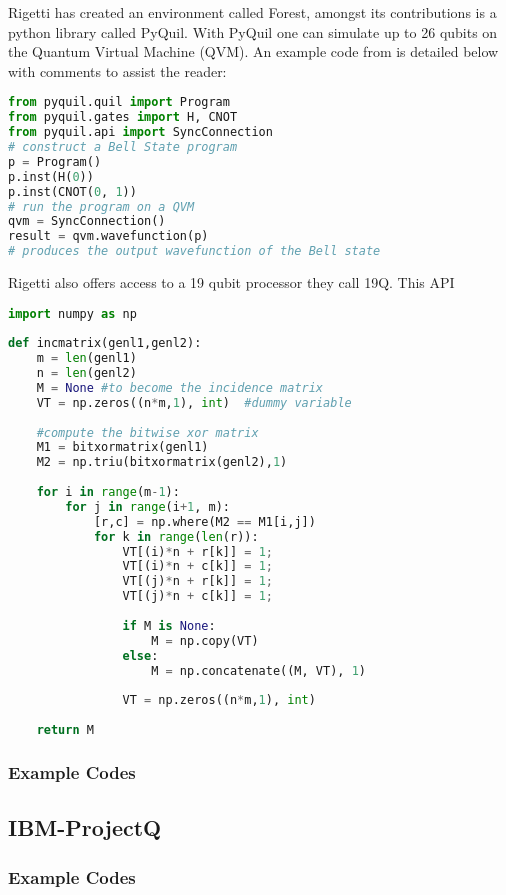 Rigetti has created an environment called Forest, amongst its contributions is a python library called PyQuil. With PyQuil one can simulate up to 26 qubits on the Quantum Virtual Machine (QVM). An example code from \cite{rigetti} is detailed below with comments to assist the reader:
\begin{lstlisting}[language=Python]
from pyquil.quil import Program
from pyquil.gates import H, CNOT
from pyquil.api import SyncConnection
# construct a Bell State program
p = Program()
p.inst(H(0))
p.inst(CNOT(0, 1))
# run the program on a QVM
qvm = SyncConnection()
result = qvm.wavefunction(p) 
# produces the output wavefunction of the Bell state
\end{lstlisting}
Rigetti also offers access to a 19 qubit processor they call 19Q. This API 
\begin{lstlisting}[language=Python]
import numpy as np
 
def incmatrix(genl1,genl2):
    m = len(genl1)
    n = len(genl2)
    M = None #to become the incidence matrix
    VT = np.zeros((n*m,1), int)  #dummy variable
 
    #compute the bitwise xor matrix
    M1 = bitxormatrix(genl1)
    M2 = np.triu(bitxormatrix(genl2),1) 
 
    for i in range(m-1):
        for j in range(i+1, m):
            [r,c] = np.where(M2 == M1[i,j])
            for k in range(len(r)):
                VT[(i)*n + r[k]] = 1;
                VT[(i)*n + c[k]] = 1;
                VT[(j)*n + r[k]] = 1;
                VT[(j)*n + c[k]] = 1;
 
                if M is None:
                    M = np.copy(VT)
                else:
                    M = np.concatenate((M, VT), 1)
 
                VT = np.zeros((n*m,1), int)
 
    return M
\end{lstlisting}

\subsubsection{Example Codes}


\subsection{IBM-ProjectQ}

\subsubsection{Example Codes}

